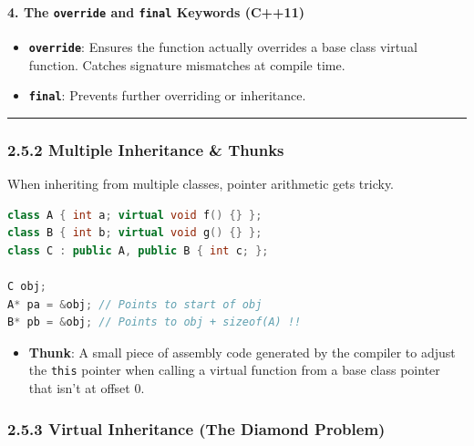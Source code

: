 \hypertarget{the-override-and-final-keywords-c11}{%
\paragraph{\texorpdfstring{4. The \texttt{override} and \texttt{final}
Keywords
(C++11)}{4. The override and final Keywords (C++11)}}\label{the-override-and-final-keywords-c11}}

\begin{itemize}
\tightlist
\item
  \textbf{\passthrough{\lstinline!override!}}: Ensures the function
  actually overrides a base class virtual function. Catches signature
  mismatches at compile time.
\item
  \textbf{\passthrough{\lstinline!final!}}: Prevents further overriding
  or inheritance.
\end{itemize}

\begin{center}\rule{0.5\linewidth}{0.5pt}\end{center}

\hypertarget{multiple-inheritance-thunks}{%
\subsubsection{2.5.2 Multiple Inheritance \&
Thunks}\label{multiple-inheritance-thunks}}

When inheriting from multiple classes, pointer arithmetic gets tricky.

\begin{lstlisting}[language={C++}]
class A { int a; virtual void f() {} };
class B { int b; virtual void g() {} };
class C : public A, public B { int c; };

C obj;
A* pa = &obj; // Points to start of obj
B* pb = &obj; // Points to obj + sizeof(A) !!
\end{lstlisting}

\begin{itemize}
\tightlist
\item
  \textbf{Thunk}: A small piece of assembly code generated by the
  compiler to adjust the \passthrough{\lstinline!this!} pointer when
  calling a virtual function from a base class pointer that isn't at
  offset 0.
\end{itemize}

\hypertarget{virtual-inheritance-the-diamond-problem}{%
\subsubsection{2.5.3 Virtual Inheritance (The Diamond
Problem)}\label{virtual-inheritance-the-diamond-problem}}


